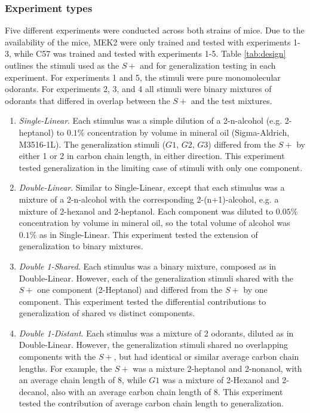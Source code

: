 \subsubsection*{Experiment types}
\label{sec:methods_experiment_types}
Five different experiments were conducted across both strains of mice. 
Due to the availability of the mice, MEK2 were only trained and tested with experiments 1-3, while C57 was trained and tested with experiments 1-5.  
Table \ref{tab:design} outlines the stimuli used as the $S+$ and for generalization testing in each experiment. 
For experiments 1 and 5, the stimuli were pure monomolecular odorants. 
For experiments 2, 3, and 4 all stimuli were binary mixtures of odorants that differed in overlap between the $S+$ and the test mixtures. 

\begin{enumerate}[i]
\item \textit{Single-Linear}. Each stimulus was a simple dilution of a 2-n-alcohol (e.g. 2-heptanol) to $0.1\%$ concentration by volume in mineral oil (Sigma-Aldrich, M3516-1L). 
The generalization stimuli ($G1$, $G2$, $G3$) differed from the $S+$ by either 1 or 2 in carbon chain length, in either direction.  
This experiment tested generalization in the limiting case of stimuli with only one component.   

\item \textit{Double-Linear}. Similar to Single-Linear, except that each stimulus was a mixture of a 2-n-alcohol with the corresponding 2-(n+1)-alcohol, e.g. a mixture of 2-hexanol and 2-heptanol.  
Each component was diluted to $0.05\%$ concentration by volume in mineral oil, so the total volume of alcohol was $0.1\%$ as in Single-Linear.  
This experiment tested the extension of generalization to binary mixtures.  

\item \textit{Double 1-Shared}. Each stimulus was a binary mixture, composed as in Double-Linear. 
However, each of the generalization stimuli shared with the $S+$ one component (2-Heptanol) and differed from the $S+$ by one component.  
This experiment tested the differential contributions to generalization of shared vs distinct components.  

\item \textit{Double 1-Distant}. Each stimulus was a mixture of 2 odorants, diluted as in Double-Linear. However, the generalization stimuli shared no overlapping components with the $S+$, but had identical or similar average carbon chain lengths. 
For example, the $S+$ was a mixture 2-heptanol and 2-nonanol, with an average chain length of 8, while $G1$ was a mixture of 2-Hexanol and 2-decanol, also with an average carbon chain length of 8.  This experiment tested the contribution of average carbon chain length to generalization.  


\end{enumerate}
